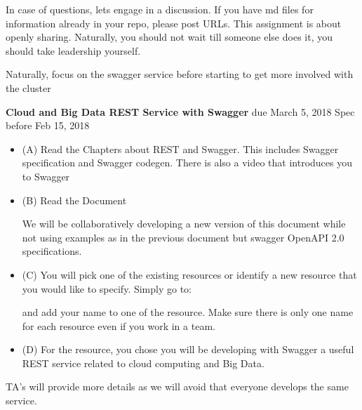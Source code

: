 \begin{exercise}
\begin{itemize}
\begin{itemize}
  \end{itemize}
 \end{itemize}
 
In case of questions, lets engage in a discussion. If you have md
files for information already in your repo, please post URLs. This
assignment is about openly sharing. Naturally, you should not wait
till someone else does it, you should take leadership yourself.

 
Naturally, focus on the swagger service before starting to get more
involved with the cluster

\end{exercise}

\begin{exercise} {\bf Cloud and Big Data REST Service with Swagger}
  due March 5, 2018 Spec before Feb 15, 2018

\begin{itemize}
     
\item (A) Read the Chapters about REST and Swagger. This includes
  Swagger specification and Swagger codegen. There is also a video
  that introduces you to Swagger 
 
\item (B) Read the Document
 
  We will be collaboratively developing a new version of this document
  while not using examples as in the previous document but swagger
  OpenAPI 2.0 specifications.
 
\item (C) You will pick one of the existing resources or identify a
  new resource that you would like to specify. Simply go to:


and add your name to one of the resource. Make sure there is only one
name for each resource even if you work in a team.
 
\item (D) For the resource, you chose you will be developing with
  Swagger a useful REST service related to cloud computing and Big
  Data.

 
 \end{itemize}

 TA's will provide more details as we will avoid that everyone
 develops the same service.
 

\end{exercise}
